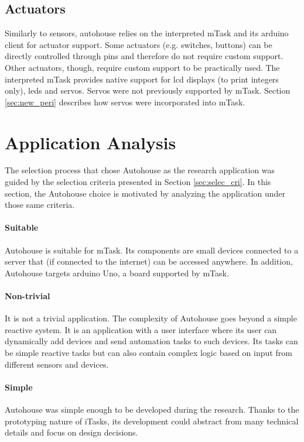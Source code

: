 \subsection{Actuators}

Similarly to sensors, \gls{autohouse} relies on the interpreted \gls{mTask} and its \gls{arduino} client for actuator support. Some actuators (e.g. switches, buttons) can be directly controlled through pins and therefore do not require custom support. Other actuators, though, require custom support to be practically used. The interpreted \gls{mTask} provides native support for \acs{lcd} displays (to print integers only), \acsp{led} and servos. Servos were not previously supported by \gls{mTask}. Section \ref{sec:new_peri} describes how servos were incorporated into \gls{mTask}.

\section{Application Analysis}\label{sec:app_analysis}

The selection process that chose Autohouse as the research application was guided by the selection criteria presented in Section \ref{sec:selec_cri}. In this section, the Autohouse choice is motivated by analyzing the application under those same criteria.

\paragraph{Suitable} Autohouse is suitable for \gls{mTask}. Its components are small devices connected to a server that (if connected to the internet) can be accessed anywhere. In addition, Autohouse targets \gls{arduino} Uno, a board supported by \gls{mTask}.

\paragraph{Non-trivial} It is not a trivial application. The complexity of Autohouse goes beyond a simple reactive system. It is an application with a user interface where its user can dynamically add devices and send automation tasks to such devices. Its tasks can be simple reactive tasks but can also contain complex logic based on input from different sensors and devices.

\paragraph{Simple} Autohouse was simple enough to be developed during the research. Thanks to the prototyping nature of \gls{iTasks}, its development could abstract from many technical details and focus on design decisions.

